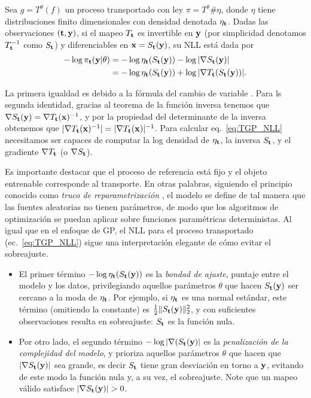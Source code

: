 \begin{proposition}
	Sea \(g = T^\theta(f)\) un proceso transportado con ley \(\pi = T^\theta\#\eta\), donde \(\eta\) tiene distribuciones finito dimensionales con densidad denotada \(\eta_{\mathbf{t}}\). Dadas las observaciones \((\mathbf{t},\mathbf{y})\), si el mapeo \(T_{\mathbf{t}}\) es invertible en \(\mathbf{y}\) (por simplicidad denotamos \(T_{\mathbf{t}}^{-1}\) como \(S_{\mathbf{t}}\)) y diferenciables en \(\mathbf{x}=S_{\mathbf{t}}(\mathbf{y})\), su NLL está dada por
	\begin{align}
	\label{eq:TGP_NLL}
	-\log \pi_{\mathbf{t}}(\mathbf{y}|\theta) &= -\log \eta_{\mathbf{t}}(S_{\mathbf{t}}(\mathbf{y})) - \log |\nabla S_{\mathbf{t}}(\mathbf{y})|\nonumber\\
	&= -\log \eta_{\mathbf{t}}(S_{\mathbf{t}}(\mathbf{y})) + \log |\nabla T_{\mathbf{t}}(S_{\mathbf{t}}(\mathbf{y}))|.
	\end{align}
\end{proposition}
La primera igualdad es debido a la fórmula del cambio de variable \cite{hogg1995introduction}. Para ls segunda identidad, gracias al teorema de la función inversa \cite{rudin1964principles} tenemos que \(\nabla S_{\mathbf{t}}(\mathbf{y}) = \nabla T_{\mathbf{t}}(\mathbf{x})^{-1}\), y por la propiedad del determinante de la inversa \cite{petersen2008matrix} obtenemos que \(|\nabla T_{\mathbf{t}}(\mathbf{x})^{-1}| = |\nabla T_{\mathbf{t}}(\mathbf{x})|^{-1}\). Para calcular eq.~\eqref{eq:TGP_NLL} necesitamos ser capaces de computar la log densidad de \(\eta_{\mathbf{t}}\), la inversa \(S_{\mathbf{t}}\), y el gradiente \(\nabla T_{\mathbf{t}}\) (o \(\nabla S_{\mathbf{t}}\)).

Es importante destacar que el proceso de referencia está fijo y el objeto entrenable corresponde al transporte. En otras palabras, siguiendo el principio conocido como \emph{truco de reparametrización} \cite{kingma2013auto}, el modelo se define de tal manera que las fuentes aleatorias no tienen parámetros, de modo que los algoritmos de optimización se puedan aplicar sobre funciones paramétricas deterministas. Al igual que en el enfoque de GP, el NLL para el proceso transportado (ec.~\eqref{eq:TGP_NLL}) sigue una interpretación elegante de cómo evitar el sobreajuste.

\begin{itemize}
	\item El primer término \(-\log \eta_{\mathbf{t}}(S_{\mathbf{t}}(\mathbf{y}))\) es la \emph{bondad de ajuste}, puntaje entre el modelo y los datos, privilegiando aquellos parámetros \(\theta\) que hacen \(S_{\mathbf{t}}(\mathbf{y})\) ser cercano a la moda de \(\eta_{\mathbf{t}}\). Por ejemplo, si \(\eta_{\mathbf{t}}\) es una normal estándar, este término (omitiendo la constante) es \(\frac{1}{2}\lVert S_{\mathbf{t}}(\mathbf{y}) \rVert_{2}^2\), y con suficientes observaciones resulta en sobreajuste: \(S_{\mathbf{t}}\) es la función nula.
	\item Por otro lado, el segundo término \(-\log |\nabla(S_{\mathbf{t}}(\mathbf{y})|\) es la \emph{penalización de la complejidad del modelo}, y prioriza aquellos parámetros \(\theta\) que hacen que \(|\nabla S_{\mathbf{t}}(\mathbf{y})|\) sea grande, es decir \(S_{\mathbf{t}}\) tiene gran desviación en torno a \(\mathbf{y}\), evitando de este modo la función nula y, a su vez, el sobreajuste. Note que un mapeo válido satisface \(|\nabla S_{\bft}(\bfy)|>0\).
\end{itemize}  

